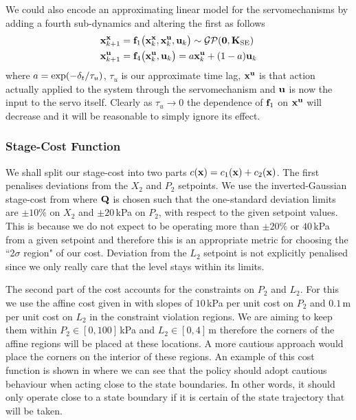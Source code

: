 We could also encode an approximating linear model for the servomechanisms by adding a fourth sub-dynamics and altering the first as follows
\begin{align*}
\mathbf{x}^{\mathbf{x}}_{k+1} &= \mathbf{f}_1\big(\mathbf{x}^{\mathbf{x}}_{k}, \mathbf{x}^{\mathbf{u}}_{k}, \mathbf{u}_k \big)
\sim \mathcal{GP}(\mathbf{0},\mathbf{K}_{\text{SE}}) \\
\mathbf{x}^{\mathbf{u}}_{k+1} &= \mathbf{f}_4\big( \mathbf{x}^{\mathbf{u}}_{k}, \mathbf{u}_k \big)
= a\mathbf{x}^{\mathbf{u}}_k + (1 - a)\mathbf{u}_k
\end{align*}
where $a = \mathrm{exp}(-\delta_t/\tau_u)$, $\tau_u$ is our approximate time lag, $\mathbf{x}^{\mathbf{u}}$ is that action actually applied to the system through the servomechanism and $\mathbf{u}$ is now the input to the servo itself. Clearly as $\tau_u \rightarrow 0$ the dependence of $\mathbf{f}_1$ on $\mathbf{x}^{\mathbf{u}}$ will decrease and it will be reasonable to simply ignore its effect.





\subsubsection{Stage-Cost Function}
We shall split our stage-cost into two parts $c(\mathbf{x}) = c_1(\mathbf{x}) + c_2(\mathbf{x})$. The first penalises deviations from the $X_2$ and $P_2$ setpoints. We use the inverted-Gaussian stage-cost from  where $\mathbf{Q}$ is chosen such that the one-standard deviation limits are $\pm 10\%$ on $X_2$ and $\pm 20\,$kPa on $P_2$, with respect to the given setpoint values. This is because we do not expect to be operating more than $\pm 20\%$ or $40\,$kPa from a given setpoint and therefore this is an appropriate metric for choosing the ``2$\sigma$ region" of our cost.
Deviation from the $L_2$ setpoint is not explicitly penalised since we only really care that the level stays within its limits.


The second part of the cost accounts for the constraints on $P_2$ and $L_2$. For this we use the affine cost given in  with slopes of $10\,$kPa per unit cost on $P_2$ and $0.1\,$m per unit cost on $L_2$ in the constraint violation regions. We are aiming to keep them within $P_2 \in [0,100]\,$kPa and $L_2\in [0,4]\,$m therefore the corners of the affine regions will be placed at these locations. A more cautious approach would place the corners on the interior of these regions. An example of this cost function is shown in  where we can see that the policy should adopt cautious behaviour when acting close to the state boundaries. In other words, it should only operate close to a state boundary if it is certain of the state trajectory that will be taken.





